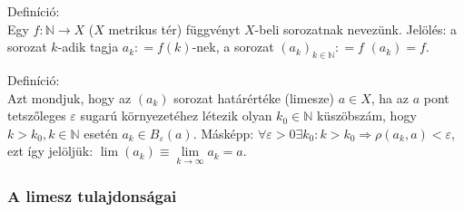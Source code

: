 \documentclass[]{scrartcl}
\newenvironment{definicio}{}{}
\begin{document}
\begin{definicio}

Definíció:\\
Egy \(\left. f:{\mathbb{N}}\rightarrow X \right.\) (\(X\) metrikus tér)
függvényt \(X\)-beli sorozatnak nevezünk. Jelölés: a sorozat \(k\)-adik
tagja \(a_{k}: = f\left( k \right)\)-nek, a sorozat
\(\left( a_{k} \right)_{k \in {\mathbb{N}}}: = f\)
\(\left( a_{k} \right) = f\).

\end{definicio}

\begin{definicio}

Definíció:\\
Azt mondjuk, hogy az \(\left( a_{k} \right)\) sorozat határértéke
(limesze) \(a \in X\), ha az \(a\) pont tetszőleges \(\varepsilon\)
sugarú környezetéhez létezik olyan \(k_{0} \in {\mathbb{N}}\)
küszöbszám, hogy \(k > k_{0},k \in {\mathbb{N}}\) esetén
\(a_{k} \in B_{\varepsilon}\left( a \right)\). Másképp:
\(\left. \forall\varepsilon > 0\exists k_{0}:k > k_{0}\Rightarrow\rho\left( {a_{k},a} \right) < \varepsilon \right.\),
ezt így jelöljük:
\({\lim\left( a_{k} \right) \equiv \underset{k\rightarrow\infty}{\lim}a_{k} = a}.\)

\end{definicio}

\subsubsection{A limesz tulajdonságai}\label{a-limesz-tulajdonsagai}
\end{document}
